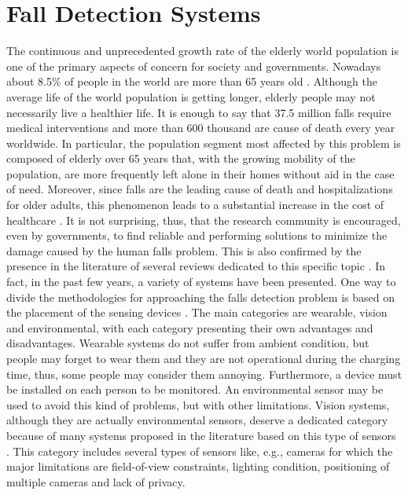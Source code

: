 \section{Fall Detection Systems}
The continuous and unprecedented growth rate of the elderly world population is one of the primary aspects of concern for society and governments. Nowadays about 8.5\% of people in the world are more than 65 years old \cite{dhhsOlderPop,Carone2006}. Although the average life of the world population is getting longer, elderly people may not    necessarily live a healthier life. It is enough to say that 37.5 million falls require medical interventions and more than 600 thousand are cause of death every year worldwide. In particular, the population segment most affected by this problem is composed of elderly over 65 years that, with the growing mobility of the population, are more frequently left alone in their homes without aid in the case of need. Moreover, since falls are the leading cause of death and hospitalizations for older adults, this phenomenon leads to a substantial increase in the cost of healthcare \cite{whoFall, mubashir2013survey}. 
It is not surprising, thus, that the research community is encouraged, even by governments, to find reliable and performing solutions to minimize the damage caused by the human falls problem. This is also confirmed by the presence in the literature of several reviews dedicated to this specific topic \cite{mubashir2013survey, khan2017review, lapierre2017state, pannurat2014automatic, xu2018new, el2013fall}.
In fact, in the past few years, a variety of systems have been presented. One way to divide the methodologies for approaching the falls detection problem is based on the placement of the sensing devices \cite{mubashir2013survey}. The main categories are wearable, vision and environmental, with each category presenting their own advantages and disadvantages. Wearable systems do not suffer from ambient condition, but people may forget to wear them and they are not operational during the charging time, thus, some people may consider them annoying. Furthermore, a device must be installed on each person to be monitored. An environmental sensor may be used to avoid this kind of problems, but with other limitations. Vision systems, although they are actually environmental sensors, deserve a dedicated category because of many systems proposed in the literature based on this type of sensors \cite{mubashir2013survey}. This category includes several types of sensors like, e.g., cameras for which the major limitations are field-of-view constraints, lighting condition, positioning of multiple cameras and lack of privacy.
